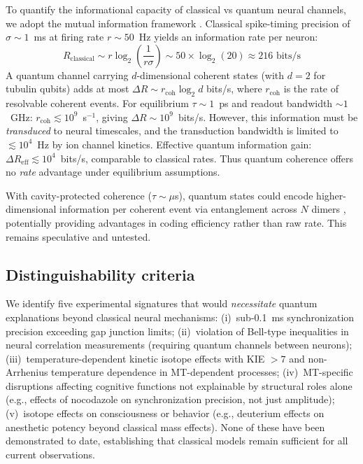 \documentclass[twocolumn,10pt]{article}
\begin{document}
To quantify the informational capacity of classical vs quantum neural
channels, we adopt the mutual information framework
\cite{Borst1999,Strong1998}. Classical spike-timing precision of
$\sigma \sim 1$~ms at firing rate $r \sim 50$~Hz yields an information
rate per neuron:
\begin{equation}
R_{\text{classical}} \sim r \log_2\!\left(\frac{1}{r\sigma}\right)
\sim 50 \times \log_2(20) \approx 216 \text{~bits/s}
\end{equation}
A quantum channel carrying $d$-dimensional coherent states (with $d=2$ for
tubulin qubits) adds at most $\Delta R \sim r_{\text{coh}} \log_2 d$
bits/s, where $r_{\text{coh}}$ is the rate of resolvable coherent events.
For equilibrium $\tau \sim 1$~ps and readout bandwidth $\sim 1$~GHz:
$r_{\text{coh}} \lesssim 10^9$~s$^{-1}$, giving $\Delta R \sim 10^9$~bits/s.
However, this information must be \textit{transduced} to neural timescales,
and the transduction bandwidth is limited to $\lesssim 10^4$~Hz by ion
channel kinetics. Effective quantum information gain:
$\Delta R_{\text{eff}} \lesssim 10^4$~bits/s, comparable to classical
rates. Thus quantum coherence offers no \textit{rate} advantage under
equilibrium assumptions.

With cavity-protected coherence ($\tau \sim \mu$s), quantum states could
encode higher-dimensional information per coherent event via entanglement
across $N$ dimers \cite{Giovannetti2004}, potentially providing advantages
in coding efficiency rather than raw rate. This remains speculative and
untested.


\subsection{Distinguishability criteria}

We identify five experimental signatures that would \textit{necessitate}
quantum explanations beyond classical neural mechanisms:
(i)~sub-0.1~ms synchronization precision exceeding gap junction limits;
(ii)~violation of Bell-type inequalities in neural correlation
measurements (requiring quantum channels between neurons);
(iii)~temperature-dependent kinetic isotope effects with KIE $> 7$ and
non-Arrhenius temperature dependence in MT-dependent processes;
(iv)~MT-specific disruptions affecting cognitive functions not explainable
by structural roles alone (e.g., effects of nocodazole on synchronization
precision, not just amplitude);
(v)~isotope effects on consciousness or behavior (e.g., deuterium effects
on anesthetic potency beyond classical mass effects).
None of these have been demonstrated to date, establishing that classical
models remain sufficient for all current observations.
\end{document}
